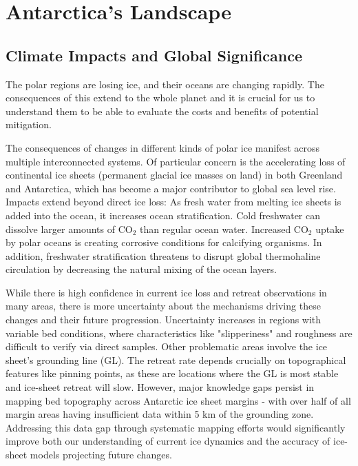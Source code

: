 \chapter{Antarctica's Landscape}\label{why}
\section*{Climate Impacts and Global Significance}

The polar regions are losing ice, and their oceans are changing rapidly\cite{O_C_in_changingClimate}. The consequences of this extend to the whole planet and it is crucial for us to understand them to be able to evaluate the costs and benefits of potential mitigation. 

The consequences of changes in different kinds of polar ice manifest across multiple interconnected systems. Of particular concern is the accelerating loss of continental ice sheets (permanent glacial ice masses on land) in both Greenland and Antarctica, which has become a major contributor to global sea level rise\cite{O_C_in_changingClimate}. Impacts extend beyond direct ice loss: As fresh water from melting ice sheets is added into the ocean, it increases ocean stratification. Cold freshwater can dissolve larger amounts of $\mathrm{CO_2}$ than regular ocean water. Increased $\mathrm{CO_2}$ uptake by polar oceans is creating corrosive conditions for calcifying organisms\cite{O_C_in_changingClimate}. In addition, freshwater stratification threatens to disrupt global thermohaline circulation\cite{Jacobs_2004} by decreasing the natural mixing of the ocean layers.
 
While there is high confidence in current ice loss and retreat observations in many areas, there is more uncertainty about the mechanisms driving these changes and their future progression\cite{Fox-Kemper_2021}. Uncertainty increases in regions with variable bed conditions, where characteristics like "slipperiness" and roughness are difficult to verify via direct samples. Other problematic areas involve the ice sheet's grounding line (GL). The retreat rate depends crucially on topographical features like pinning points, as these are locations where the GL is most stable and ice-sheet retreat will slow\cite{Fox-Kemper_2021}. However, major knowledge gaps persist in mapping bed topography across Antarctic ice sheet margins - with over half of all margin areas having insufficient data within 5 km of the grounding zone\cite{RINGS_2022}. Addressing this data gap through systematic mapping efforts would significantly improve both our understanding of current ice dynamics and the accuracy of ice-sheet models projecting future changes.

